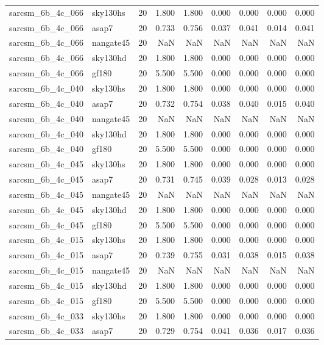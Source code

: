 \begin{tabular}{llrrrrrrr}
sarcsm\_6b\_4c\_066 & sky130hs & 20 & 1.800 & 1.800 & 0.000 & 0.000 & 0.000 & 0.000 \\
sarcsm\_6b\_4c\_066 & asap7 & 20 & 0.733 & 0.756 & 0.037 & 0.041 & 0.014 & 0.041 \\
sarcsm\_6b\_4c\_066 & nangate45 & 20 & NaN & NaN & NaN & NaN & NaN & NaN \\
sarcsm\_6b\_4c\_066 & sky130hd & 20 & 1.800 & 1.800 & 0.000 & 0.000 & 0.000 & 0.000 \\
sarcsm\_6b\_4c\_066 & gf180 & 20 & 5.500 & 5.500 & 0.000 & 0.000 & 0.000 & 0.000 \\
sarcsm\_6b\_4c\_040 & sky130hs & 20 & 1.800 & 1.800 & 0.000 & 0.000 & 0.000 & 0.000 \\
sarcsm\_6b\_4c\_040 & asap7 & 20 & 0.732 & 0.754 & 0.038 & 0.040 & 0.015 & 0.040 \\
sarcsm\_6b\_4c\_040 & nangate45 & 20 & NaN & NaN & NaN & NaN & NaN & NaN \\
sarcsm\_6b\_4c\_040 & sky130hd & 20 & 1.800 & 1.800 & 0.000 & 0.000 & 0.000 & 0.000 \\
sarcsm\_6b\_4c\_040 & gf180 & 20 & 5.500 & 5.500 & 0.000 & 0.000 & 0.000 & 0.000 \\
sarcsm\_6b\_4c\_045 & sky130hs & 20 & 1.800 & 1.800 & 0.000 & 0.000 & 0.000 & 0.000 \\
sarcsm\_6b\_4c\_045 & asap7 & 20 & 0.731 & 0.745 & 0.039 & 0.028 & 0.013 & 0.028 \\
sarcsm\_6b\_4c\_045 & nangate45 & 20 & NaN & NaN & NaN & NaN & NaN & NaN \\
sarcsm\_6b\_4c\_045 & sky130hd & 20 & 1.800 & 1.800 & 0.000 & 0.000 & 0.000 & 0.000 \\
sarcsm\_6b\_4c\_045 & gf180 & 20 & 5.500 & 5.500 & 0.000 & 0.000 & 0.000 & 0.000 \\
sarcsm\_6b\_4c\_015 & sky130hs & 20 & 1.800 & 1.800 & 0.000 & 0.000 & 0.000 & 0.000 \\
sarcsm\_6b\_4c\_015 & asap7 & 20 & 0.739 & 0.755 & 0.031 & 0.038 & 0.015 & 0.038 \\
sarcsm\_6b\_4c\_015 & nangate45 & 20 & NaN & NaN & NaN & NaN & NaN & NaN \\
sarcsm\_6b\_4c\_015 & sky130hd & 20 & 1.800 & 1.800 & 0.000 & 0.000 & 0.000 & 0.000 \\
sarcsm\_6b\_4c\_015 & gf180 & 20 & 5.500 & 5.500 & 0.000 & 0.000 & 0.000 & 0.000 \\
sarcsm\_6b\_4c\_033 & sky130hs & 20 & 1.800 & 1.800 & 0.000 & 0.000 & 0.000 & 0.000 \\
sarcsm\_6b\_4c\_033 & asap7 & 20 & 0.729 & 0.754 & 0.041 & 0.036 & 0.017 & 0.036 \\

\end{tabular}

